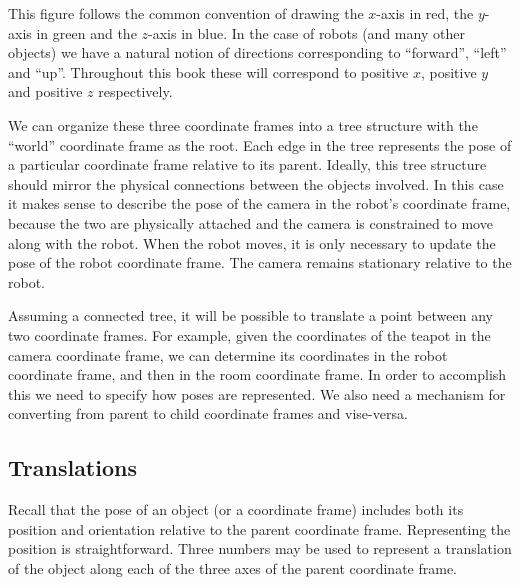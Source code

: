This figure follows the common convention of drawing the $x$-axis in
red, the $y$-axis in green and the $z$-axis in blue.  In the case of
robots (and many other objects) we have a natural notion of directions
corresponding to ``forward'', ``left'' and ``up''.  Throughout this
book these will correspond to positive $x$, positive $y$ and positive
$z$ respectively.

We can organize these three coordinate frames into a tree structure
with the ``world'' coordinate frame as the root.  Each edge in the
tree represents the pose of a particular coordinate frame relative to
its parent.  Ideally, this tree structure should mirror the physical
connections between the objects involved.  In this case it makes sense
to describe the pose of the camera in the robot's coordinate frame,
because the two are physically attached and the camera is constrained
to move along with the robot.  When the robot moves, it is only
necessary to update the pose of the robot coordinate frame.  The
camera remains stationary relative to the robot.


Assuming a connected tree, it will be possible to translate a point
between any two coordinate frames.  For example, given the coordinates
of the teapot in the camera coordinate frame, we can determine its
coordinates in the robot coordinate frame, and then in the room
coordinate frame.  In order to accomplish this we need to specify how
poses are represented.  We also need a mechanism for converting from
parent to child coordinate frames and vise-versa.



\subsection{Translations}
\label{sec:tranlations}
Recall that the pose of an object (or a coordinate frame) includes
both its position and orientation relative to the parent coordinate
frame.  Representing the position is straightforward.  Three numbers
may be used to represent a translation of the object along each of the
three axes of the parent coordinate frame.


